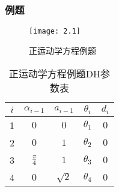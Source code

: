 \documentclass[
12pt, %
a4paper, 
oneside, %
headinclude,footinclude, %
]{scrartcl}
\begin{document}
\subsubsection[例题]{例题}
\noindent
\begin{minipage}{0.45\textwidth}
\begin{figure}[H]
\centering
\texttt{[image: 2.1]}
\caption{正运动学方程例题}
\end{figure}
\end{minipage}
\begin{minipage}{0.55\textwidth}
\begin{table}[H]
\centering
\begin{tabular}{c|cccc}
\hline
$ i $ & $ \alpha_{i - 1} $ & $ a_{i - 1} $ & $ \theta_i $ & $ d_i $ \\
\hline
1 & $ 0 $ & $ 0 $ & $ \theta_1 $ & $ 0 $ \\
2 & $ 0 $ & $ 1 $ & $ \theta_2 $ & $ 0 $ \\
3 & $ \frac{\pi}{4} $ & $ 1 $ & $ \theta_3 $ & $ 0 $ \\
4 & $ 0 $ & $ \sqrt{2} $ & $ \theta_4 $ & $ 0 $ \\
\hline
\end{tabular}
\caption{正运动学方程例题DH参数表}
\end{table}
\end{minipage}
\end{document}
